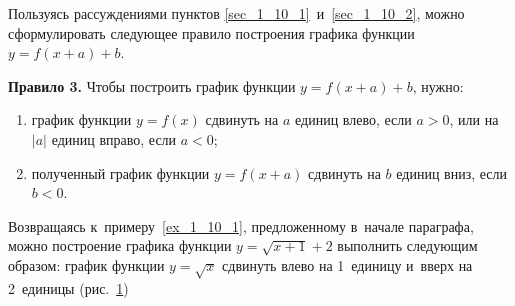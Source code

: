 
Пользуясь рассуждениями пунктов \ref{sec_1_10_1}~и~\ref{sec_1_10_2},
можно сформулировать следующее правило построения графика функции $y = f(x+a) + b$.

\textbf{Правило 3.} Чтобы построить график функции $y = f(x+a) + b$,
нужно:
\begin{enumerate}
\item график функции $y = f(x)$ сдвинуть на $a$ единиц влево,
если $a > 0$, или на $|a|$ единиц вправо, если $a < 0$;
\item полученный график функции $y = f(x+a)$ сдвинуть на $b$ единиц
вниз, если $b < 0$.
\end{enumerate}

\begin{figure}
\end{figure}

Возвращаясь к~примеру~\ref{ex_1_10_1}, предложенному в~начале параграфа,
можно построение графика функции $y = \sqrt{x + 1} + 2$
выполнить следующим образом: график функции $y = \sqrt{x}$ 
сдвинуть влево на 1~единицу и~вверх на 2~единицы (рис.\ \ref{fig_1_10_24})

\begin{figure}\label{fig_1_10_24}
\end{figure}

